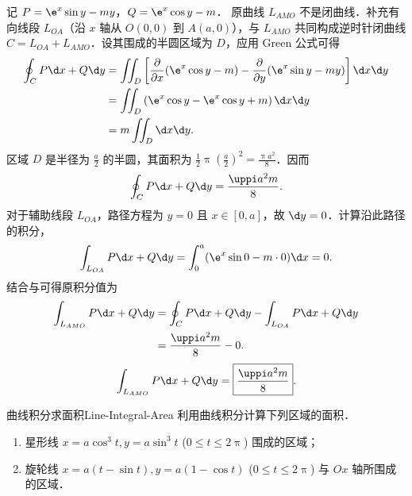 \begin{solution}
    记 $P = \e^x \sin y - my$，$Q = \e^x \cos y - m$．
    原曲线 $L_{AMO}$ 不是闭曲线．补充有向线段 $L_{OA}$（沿 $x$ 轴从 $O(0,0)$ 到 $A(a,0)$），与 $L_{AMO}$ 共同构成逆时针闭曲线 $C = L_{OA} + L_{AMO}$．设其围成的半圆区域为 $D$，应用 Green 公式可得
    \begin{equation}
        \begin{aligned}
            \oint_C P \d x + Q \d y & = \iint_D \left[ \frac{\partial}{\partial x}(\e^x \cos y - m) - \frac{\partial}{\partial y}(\e^x \sin y - my) \right] \d x \d y \\
                                    & = \iint_D \left( \e^x \cos y - \e^x \cos y + m \right) \d x \d y                                                                \\
                                    & = m \iint_D \d x \d y.
        \end{aligned}
    \end{equation}
    区域 $D$ 是半径为 $\frac{a}{2}$ 的半圆，其面积为 $\frac{1}{2} \uppi \left(\frac{a}{2}\right)^2 = \frac{\uppi a^2}{8}$．因而
    \begin{equation}
        \label{eq:green-6-1}
        \oint_C P \d x + Q \d y = \frac{\uppi a^2 m}{8}.
    \end{equation}
    对于辅助线段 $L_{OA}$，路径方程为 $y=0$ 且 $x \in [0, a]$，故 $\d y = 0$．计算沿此路径的积分，
    \begin{equation}
        \label{eq:green-6-2}
        \int_{L_{OA}} P \d x + Q \d y = \int_0^a (\e^x \sin 0 - m \cdot 0) \d x = 0.
    \end{equation}
    结合与可得原积分值为
    \begin{equation}
        \begin{aligned}
            \int_{L_{AMO}} P \d x + Q \d y & = \oint_C P \d x + Q \d y - \int_{L_{OA}} P \d x + Q \d y \\
                                           & = \frac{\uppi a^2 m}{8} - 0.
        \end{aligned}
    \end{equation}
    \begin{equation}
        \int_{L_{AMO}} P \d x + Q \d y = \boxed{\frac{\uppi a^2 m}{8}}.
    \end{equation}
\end{solution}

\begin{problem}{曲线积分求面积}{Line-Integral-Area}
    利用曲线积分计算下列区域的面积．
    \begin{enumerate}
        \item 星形线 $x = a \cos^3 t, y = a \sin^3 t$ ($0 \le t \le 2\uppi$) 围成的区域；
        \item 旋轮线 $x = a(t - \sin t), y = a(1 - \cos t)$ ($0 \le t \le 2\uppi$) 与 $Ox$ 轴所围成的区域．
    \end{enumerate}
\end{problem}

